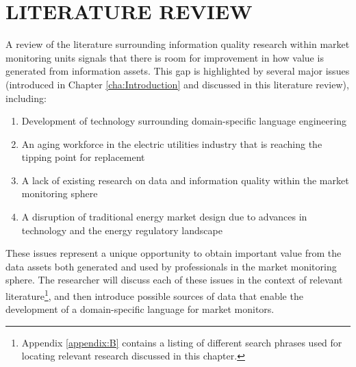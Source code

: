 %
%
%
%  
%



\chapter{\MakeUppercase{Literature Review}}
\label{cha:literature-review}

A review of the literature surrounding information quality research within market monitoring units signals that there is room for improvement in how value is generated from information assets. This gap is highlighted by several major issues (introduced in Chapter \ref{cha:Introduction} and discussed in this literature review), including:

\begin{enumerate}
    \item {Development of technology surrounding domain-specific language engineering}
    \item {An aging workforce in the electric utilities industry that is reaching the tipping point for replacement}
    \item {A lack of existing research on data and information quality within the market monitoring sphere}
    \item {A disruption of traditional energy market design due to advances in technology and the energy regulatory landscape}
\end{enumerate}

\noindent These issues represent a unique opportunity to obtain important value from the data assets both generated and used by professionals in the market monitoring sphere. The researcher will discuss each of these issues in the context of relevant literature\footnote{Appendix \ref{appendix:B} contains a listing of different search phrases used for locating relevant research discussed in this chapter.},
and then introduce possible sources of data that enable the development of a domain-specific language for market monitors.%

